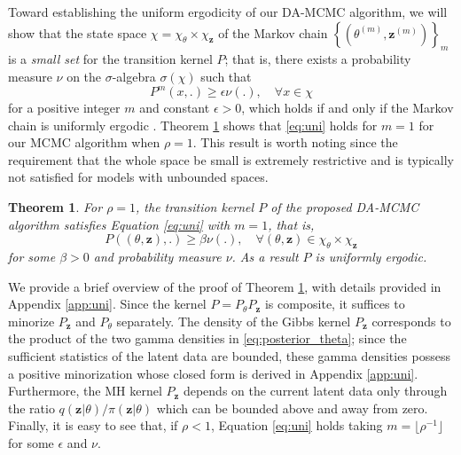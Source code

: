 \documentclass[12pt]{article}
\newtheorem{theorem}{Theorem}[section]
\begin{document}
Toward establishing the uniform ergodicity of our DA-MCMC algorithm, we will show that the state space $\chi = \chi_{\theta}\times\chi_{\mathbf{z}}$ of the Markov chain $\left\{\left(\theta^{(m)}, \mathbf{z}^{(m)}\right)\right\}_m$ is a \textit{small set} for the transition kernel $P$; that is, there exists a probability measure $\nu$ on the $\sigma$-algebra $\sigma(\chi)$ such that
\begin{equation}
	\label{eq:uni}
	P^m(x,.) \ge \epsilon \nu(.), \quad \forall x\in \chi
\end{equation}
for a positive integer $m$ and constant $\epsilon > 0$, which holds if and only if the Markov chain is uniformly ergodic \cite{Tierney.1994}.
Theorem \ref{pro:uni} shows that \eqref{eq:uni} holds for $m=1$ for our MCMC algorithm when $\rho=1$. This result is worth noting since the requirement that the whole space be small is extremely restrictive and is typically not satisfied for models with unbounded spaces.

\begin{theorem}
	\label{pro:uni}
	For $\rho = 1$, the transition kernel $P$ of the proposed DA-MCMC algorithm satisfies Equation \eqref{eq:uni} with $m=1$, that is,
	$$P((\theta, \mathbf{z}), .) \ge \beta \nu(.) , \quad \forall (\theta, \mathbf{z}) \in \chi_\theta \times \chi_\mathbf{z}
	$$
	for some $\beta>0$ and probability measure $\nu$. As a result $P$ is uniformly ergodic.
\end{theorem}

We provide a brief overview of the proof of Theorem \ref{pro:uni}, with details provided in Appendix \ref{app:uni}. Since the kernel $P = P_{\theta} P_{\mathbf{z}}$ is composite, it suffices to minorize $P_\mathbf{z}$ and $P_\theta$ separately. The density of the Gibbs kernel $P_\mathbf{z}$ corresponds to the product of the two gamma densities in \eqref{eq:posterior_theta}; since the sufficient statistics of the latent data are bounded, these gamma densities possess a positive minorization whose closed form is derived in Appendix \ref{app:uni}. Furthermore, the MH kernel $P_\mathbf{z}$ depends on the current latent data only through the ratio $q(\mathbf{z}|\theta)/\pi(\mathbf{z}|\theta)$ which can be bounded above and away from zero.
Finally, it is easy to see that, if $\rho < 1$, Equation \eqref{eq:uni} holds taking 
$m=\lfloor \rho^{-1} \rfloor$ for some $\epsilon$ and $\nu$.

\end{document}

